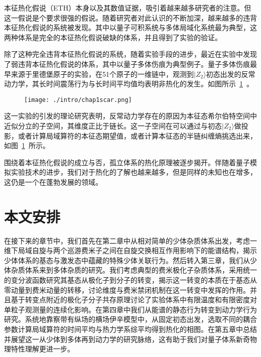 本征热化假说（ETH）本身以及其数值证据，吸引着越来越多研究者的注意。但这一假说是个要求很强的假说。随着研究者对此认识的不断加深，越来越多的违背本征热化假说的系统被发现。其中以量子可积系统\cite{kinoshita2006quantum,Rigol2007Relaxation,Calabrese2011Quantum,essler2016quench,vidmar2016generalized}与多体局域化系统\cite{basko2006metal,Serbyn2013local,Huse2014Phenomenology}最为典型，这两种体系是完全的本征热化假说破缺的体系，并且得到了实验的验证。


除了这种完全违背本征热化假说的系统，随着实验手段的进步，最近在实验中发现了弱违背本征热化假说的体系，其中以量子多体伤痕为典型例子。量子多体伤痕最早来源于里德堡原子的实验，在51个原子的一维链中，观测到$|Z_2\rangle$初态出发的反常动力学，其长时间震荡行为与长时间平均值均表明非热化的发生\cite{bernien2017probing}。如图所示~\ref{scar}~。
\begin{figure}[!htbp]
    \centering
    \texttt{[image: ./intro/chap1scar.png]}
    \label{scar}
\end{figure}
这一实验的引发的理论研究表明，反常动力学存在的原因为本征态希尔伯特空间中近似分立的子空间，其维度正比于链长。这一子空间在可以通过与初态$|Z_2\rangle$做投影，或者计算局域算符的本征态期望值，或者计算本征态的半链纠缠熵挑选出来\cite{turner2018weak,Turner2018quantum,Ho2019periodic,Choi2019emergent,Michailidis2020slow,serbyn2021quantum}，如图~\ref{scar}~所示。

围绕着本征热化假说的成立与否，孤立体系的热化原理被逐步揭开。伴随着量子模拟实验技术的进步，我们对于热化的了解也越来越多，但是同样的未知也在增多，这仍是一个在蓬勃发展的领域。








\section{本文安排}
在接下来的章节中，我们首先在第二章中从相对简单的少体杂质体系出发，考虑一维下局域自旋与两个巡游费米子之间在自旋交换相互作用影响下的能谱结构，揭示少体体系的基态与激发态中蕴藏的特殊少体关联行为。然后转入第三章，我们从少体杂质体系来到多体杂质的研究。我们考虑典型的费米极化子杂质体系，采用统一的变分波函数研究其基态从极化子到分子的转变，揭示这一转变的本质在于基态从零动量到费米动量的转移，讨论维度与费米禁闭机制在这一转变中发挥的作用。并且基于转变点附近的极化子分子共存原理讨论了实验体系中有限温度和有限密度对单粒子观测量的连续化影响。在第四章中我们从能谱的静态行为转变到动力学行为研究。系统地靠察带有纵场的横场伊辛模型中，从固定初态出发，选取不同的耦合参数计算局域算符的时间平均与热力学系综平均得到热化的相图。在第五章中总结并展望这一从少体到多体再到动力学的研究脉络，这有助于我们对量子体系新奇物理特性理解更进一步。


